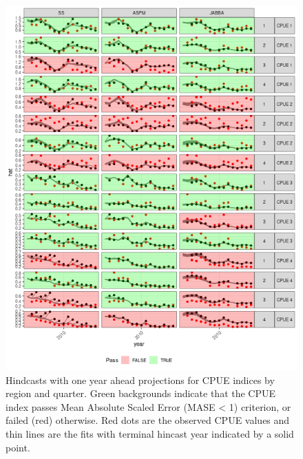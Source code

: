 \documentclass[12pt,halfline,a4paper,nonumbib]{ouparticle}
\begin{document}
\begin{figure}[htbp]
\centering
\includegraphics[width=6in]{figures/final-hy-plot-1.png}
\caption{Hindcasts with one year ahead projections for CPUE indices by region and quarter. Green backgrounds indicate that the CPUE index passes Mean Absolute Scaled Error (MASE < 1) criterion, or failed (red) otherwise. Red dots are the observed CPUE values and thin lines are the fits with terminal hincast year indicated by a solid point.}
\label{fig:hy}
\end{figure}
\end{document}
